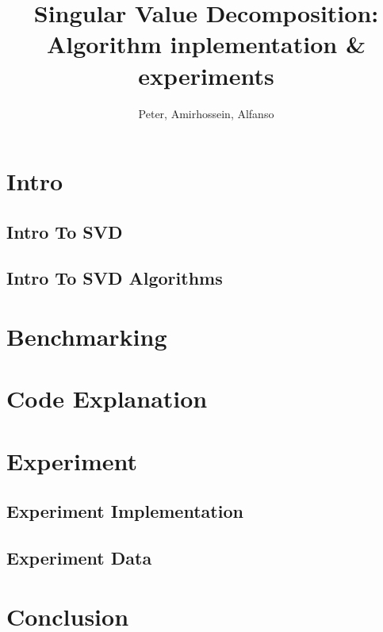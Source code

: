 \documentclass{article}
\title{Singular Value Decomposition: Algorithm inplementation & experiments}
\author{Peter, Amirhossein, Alfanso}
\begin{document}
\section{Intro}
\subsection{Intro To SVD}
\subsection{Intro To SVD Algorithms}

\section{Benchmarking}

\section{Code Explanation}

\section{Experiment}
\subsection{Experiment Implementation}
\subsection{Experiment Data}

\section{Conclusion}
\end{document}

